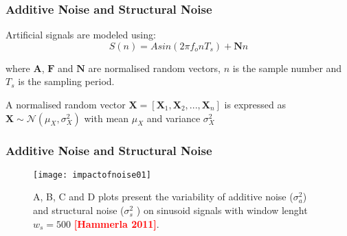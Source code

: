 \documentclass{beamer}
\begin{document}
\begin{frame}
\frametitle{Additive Noise and Structural Noise}
\vspace{-0.7cm}

Artificial signals are modeled using:
\begin{equation}
 S(n) = A sin (2\pi f_o  n T_s  )  + \textbf{N}n
\end{equation} 

where $\textbf{A}$, $\textbf{F}$ and $\textbf{N}$ are normalised random vectors,
$n$ is the sample number and $T_s$ is the sampling period.

\vspace{5mm}
A normalised random vector $\textbf{X} = [ \textbf{X}_1, \textbf{X}_2, ..., \textbf{X}_n  ]$ is expressed as 
 $\textbf{X} \sim \mathcal{N}( \mu_X , \sigma_X ^2) $ with mean $\mu_X$ and variance $\sigma_X ^2$ 

% 



\end{frame}





\begin{frame}
\frametitle{Additive Noise and Structural Noise}
\vspace{-0.7cm}


\begin{figure}[!htb]
\centering    
\texttt{[image: impactofnoise01]}
\caption[PA]{A, B, C and D plots present the variability of additive noise 
($\sigma_a ^2$) and structural noise ($\sigma_s ^2$ ) on sinusoid signals with window lenght $w_s=500$
\textcolor{red}{\textbf{[Hammerla 2011]}}.}
\label{fig:sn}
\end{figure}



\end{frame}
\end{document}
